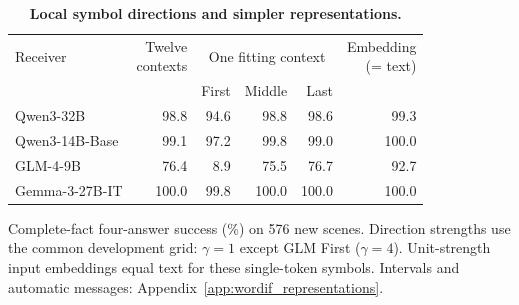 \begin{table}[!t]
\caption{\textbf{Local symbol directions and simpler representations.}}
\label{tab:wordif_representations_main}
\centering\normalsize
\setlength{\tabcolsep}{3pt}\renewcommand{\arraystretch}{1.12}
\begin{tabular*}{\linewidth}{@{\extracolsep{\fill}}lrrrrr@{}}
\toprule
Receiver & \shortstack[r]{Twelve\\contexts} & \multicolumn{3}{c}{One fitting context} & \shortstack[r]{Embedding\\(= text)} \\\cmidrule(lr){3-5}
 & & First & Middle & Last & \\
\midrule
Qwen3-32B & 98.8 & 94.6 & 98.8 & 98.6 & 99.3 \\
Qwen3-14B-Base & 99.1 & 97.2 & 99.8 & 99.0 & 100.0 \\
GLM-4-9B & 76.4 & 8.9 & 75.5 & 76.7 & 92.7 \\
Gemma-3-27B-IT & 100.0 & 99.8 & 100.0 & 100.0 & 100.0 \\
\bottomrule
\end{tabular*}
\par\vspace{3pt}
{\footnotesize\raggedright Complete-fact four-answer success (\%) on 576 new scenes. Direction strengths use the common development grid: $\gamma=1$ except GLM First ($\gamma=4$). Unit-strength input embeddings equal text for these single-token symbols. Intervals and automatic messages: Appendix~\ref{app:wordif_representations}.\par}
\end{table}
